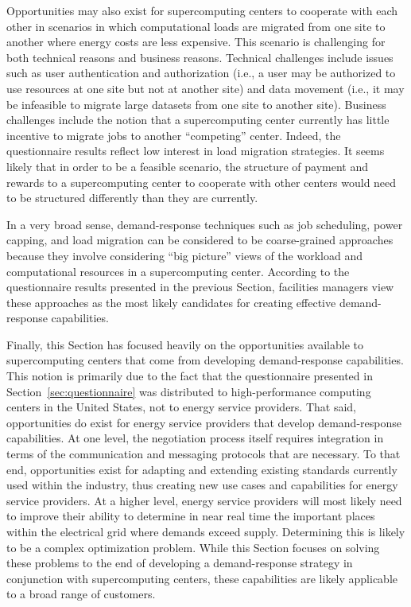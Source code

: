 Opportunities may also exist for supercomputing centers to cooperate
with each other in scenarios in which computational loads are migrated
from one site to another where energy costs are less expensive.  This
scenario is challenging for both technical reasons and business reasons.
Technical challenges include issues such as user authentication and
authorization (i.e., a user may be authorized to use resources at one
site but not at another site) and data movement (i.e., it may be
infeasible to migrate large datasets from one site to another site).
Business challenges include the notion that a supercomputing center
currently has little incentive to migrate jobs to another ``competing''
center.  Indeed, the questionnaire results reflect low interest in
load migration strategies.  It seems likely that in order to be a
feasible scenario, the structure of payment and rewards to a
supercomputing center to cooperate with other centers would need to
be structured differently than they are currently.

In a very broad sense, demand-response techniques such as job scheduling,
power capping, and load migration can be considered to be coarse-grained
approaches because they involve considering ``big picture'' views of the
workload and computational resources in a supercomputing center.  According
to the questionnaire results presented in the previous Section, facilities
managers view these approaches as the most likely candidates for creating
effective demand-response capabilities.

Finally, this Section has focused heavily on the opportunities available
to supercomputing centers that come from developing demand-response
capabilities.  This notion is primarily due to the fact that the
questionnaire presented in Section~\ref{sec:questionnaire} was
distributed to high-performance computing centers in the United
States, not to energy service providers.  That said, opportunities do
exist for energy service providers that develop demand-response
capabilities.  At one level, the negotiation process itself requires
integration in terms of the communication and messaging protocols that
are necessary.  To that end, opportunities exist for adapting and extending
existing standards currently used within the industry, thus creating new
use cases and capabilities for energy service providers.  At a higher
level, energy service providers will most likely need to improve their
ability to determine in near real time the important places within the
electrical grid where demands exceed supply.  Determining this is likely
to be a complex optimization problem.  While this Section focuses on
solving these problems to the end of developing a demand-response
strategy in conjunction with supercomputing centers, these capabilities
are likely applicable to a broad range of customers.
